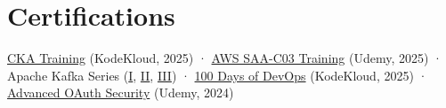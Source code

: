 \documentclass[a4paper,9pt]{extarticle}
\newcommand{\BigDivider}{}
\begin{document}

\section*{Certifications}
\BigDivider
\noindent
\href{https://www.udemy.com/certificate/UC-246987b5-df13-4f9b-a53f-d74d9de0d221/}{CKA Training} (KodeKloud, 2025) ·
\href{https://www.udemy.com/certificate/UC-b1ef5d20-5c70-472f-a936-96567f299af7/}{AWS SAA-C03 Training} (Udemy, 2025) ·
Apache Kafka Series (\href{https://www.udemy.com/certificate/UC-ec3b908f-9983-4510-bdb1-bc1fb5567a2d/}{I}, \href{https://www.udemy.com/certificate/UC-6c2275bc-4236-441a-9cb6-de7ada31a3c8/}{II}, \href{https://www.udemy.com/certificate/UC-1e1e34e9-0ba4-4c9d-bf10-3b5b16ee6f10/}{III}) ·
\href{https://engineer.kodekloud.com/certificate-verification/8a2e35fb-02fd-4082-aff3-d1fbc291f0d1}{100 Days of DevOps} (KodeKloud, 2025) ·
\href{https://www.udemy.com/certificate/UC-57aa3ba1-44be-4d7d-ab4b-e232f489411d/}{Advanced OAuth Security} (Udemy, 2024)
\end{document}
